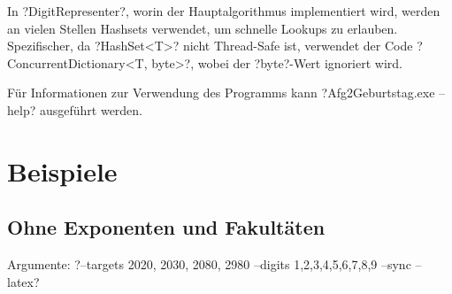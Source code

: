 \documentclass{article}
\theoremstyle{nonumberplain}
\begin{document}
In ?DigitRepresenter?, worin der Hauptalgorithmus implementiert wird, werden an vielen Stellen Hashsets verwendet, um schnelle Lookups zu erlauben.
Spezifischer, da ?HashSet<T>? nicht Thread-Safe ist, verwendet der Code ?ConcurrentDictionary<T, byte>?, wobei der ?byte?-Wert ignoriert wird.

Für Informationen zur Verwendung des Programms kann ?Afg2Geburtstag.exe --help? ausgeführt werden.

\section{Beispiele}

\subsection{Ohne Exponenten und Fakultäten}

Argumente:
?--targets 2020, 2030, 2080, 2980 --digits 1,2,3,4,5,6,7,8,9 --sync --latex?
\end{document}
